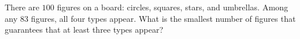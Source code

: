 There are $100$ figures on a board: circles, squares, stars, and umbrellas. Among any $83$ figures, all four types appear. What is the smallest number of figures that guarantees that at least three types appear?

